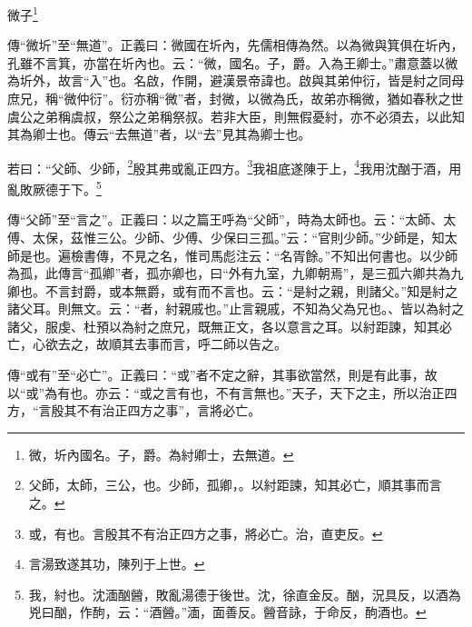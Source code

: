 微子\footnote{微，圻內國名。子，爵。為紂卿士，去無道。}

{\noindent\zhuan{}\fzbyks 傳“微圻”至“無道”。正義曰：微國在圻內，先儒相傳為然。以為微與箕俱在圻內，孔雖不言箕，亦當在圻內也。云：“微，國名。子，爵。入為王卿士。”肅意蓋以微為圻外，故言“入”也。名啟，作開，避漢景帝諱也。啟與其弟仲衍，皆是紂之同母庶兄，稱“微仲衍”。衍亦稱“微”者，封微，以微為氏，故弟亦稱微，猶如春秋之世虞公之弟稱虞叔，祭公之弟稱祭叔。若非大臣，則無假憂紂，亦不必須去，以此知其為卿士也。傳云“去無道”者，以“去”見其為卿士也。 \par}

若曰：“父師、少師，\footnote{父師，太師，三公，也。少師，孤卿，。以紂距諫，知其必亡，順其事而言之。}殷其弗或亂正四方。\footnote{或，有也。言殷其不有治正四方之事，將必亡。治，直吏反。}我祖底遂陳于上，\footnote{言湯致遂其功，陳列于上世。}我用沈酗于酒，用亂敗厥德于下。\footnote{我，紂也。沈湎酗醟，敗亂湯德于後世。沈，徐直金反。酗，況具反，以酒為兇曰酗，作䣱，云：“酒醟。”湎，面善反。醟音詠，于命反，䣱酒也。}


{\noindent\zhuan{}\fzbyks 傳“父師”至“言之”。正義曰：以之篇王呼為“父師”，時為太師也。云：“太師、太傅、太保，茲惟三公。少師、少傅、少保曰三孤。”云：“官則少師。”少師是，知太師是也。遍檢書傳，不見之名，惟司馬彪注云：“名胥餘。”不知出何書也。以少師為孤，此傳言“孤卿”者，孤亦卿也，曰“外有九室，九卿朝焉”，是三孤六卿共為九卿也。不言封爵，或本無爵，或有而不言也。云：“是紂之親，則諸父。”知是紂之諸父耳。則無文。云：“者，紂親戚也。”止言親戚，不知為父為兄也。、皆以為紂之諸父，服虔、杜預以為紂之庶兄，既無正文，各以意言之耳。以紂距諫，知其必亡，心欲去之，故順其去事而言，呼二師以告之。 \par}

{\noindent\zhuan{}\fzbyks 傳“或有”至“必亡”。正義曰：“或”者不定之辭，其事欲當然，則是有此事，故以“或”為有也。亦云：“或之言有也，不有言無也。”天子，天下之主，所以治正四方，“言殷其不有治正四方之事”，言將必亡。 \par}

